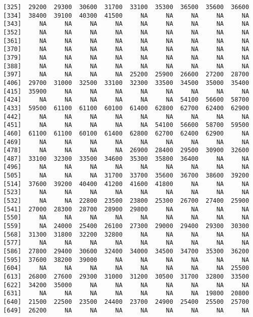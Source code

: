 \documentclass[]{article}
\begin{document}
\begin{verbatim}
  [325]  29200  29300  30600  31700  33100  35300  36500  35600  36600
  [334]  38400  39100  40300  41500     NA     NA     NA     NA     NA
  [343]     NA     NA     NA     NA     NA     NA     NA     NA     NA
  [352]     NA     NA     NA     NA     NA     NA     NA     NA     NA
  [361]     NA     NA     NA     NA     NA     NA     NA     NA     NA
  [370]     NA     NA     NA     NA     NA     NA     NA     NA     NA
  [379]     NA     NA     NA     NA     NA     NA     NA     NA     NA
  [388]     NA     NA     NA     NA     NA     NA     NA     NA     NA
  [397]     NA     NA     NA     NA  25200  25900  26600  27200  28700
  [406]  29700  31000  32500  33100  32300  33500  34500  35000  35400
  [415]  35900     NA     NA     NA     NA     NA     NA     NA     NA
  [424]     NA     NA     NA     NA     NA     NA  54100  56600  58700
  [433]  59500  61100  61100  60100  61400  62800  62700  62400  62900
  [442]     NA     NA     NA     NA     NA     NA     NA     NA     NA
  [451]     NA     NA     NA     NA     NA  54100  56600  58700  59500
  [460]  61100  61100  60100  61400  62800  62700  62400  62900     NA
  [469]     NA     NA     NA     NA     NA     NA     NA     NA     NA
  [478]     NA     NA     NA     NA  26900  28400  29500  30900  32600
  [487]  33100  32300  33500  34600  35300  35800  36400     NA     NA
  [496]     NA     NA     NA     NA     NA     NA     NA     NA     NA
  [505]     NA     NA     NA  31700  33700  35600  36700  38600  39200
  [514]  37600  39200  40400  41200  41600  41800     NA     NA     NA
  [523]     NA     NA     NA     NA     NA     NA     NA     NA     NA
  [532]     NA     NA  22800  23500  23800  25300  26700  27400  25900
  [541]  27000  28300  28700  28900  29800     NA     NA     NA     NA
  [550]     NA     NA     NA     NA     NA     NA     NA     NA     NA
  [559]     NA  24000  25400  26100  27300  29000  29400  29300  30300
  [568]  31300  31800  32200  32800     NA     NA     NA     NA     NA
  [577]     NA     NA     NA     NA     NA     NA     NA     NA     NA
  [586]  27800  29400  30600  32400  34000  34500  34700  35300  36200
  [595]  37600  38200  39000     NA     NA     NA     NA     NA     NA
  [604]     NA     NA     NA     NA     NA     NA     NA     NA  25500
  [613]  26800  27600  29300  31000  31200  30500  31700  32800  33500
  [622]  34200  35000     NA     NA     NA     NA     NA     NA     NA
  [631]     NA     NA     NA     NA     NA     NA     NA  19800  20800
  [640]  21500  22500  23500  24400  23700  24900  25400  25500  25700
  [649]  26200     NA     NA     NA     NA     NA     NA     NA     NA

\end{verbatim}
\end{document}
